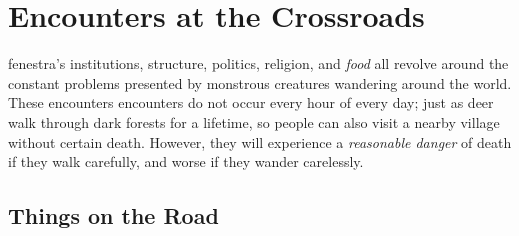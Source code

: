 \chapter{Encounters at the Crossroads}
\label{encounters}

\Gls{fenestra}'s institutions, structure, politics, religion, and \emph{food} all revolve around the constant problems presented by monstrous creatures wandering around the world.
These encounters encounters do not occur every hour of every day; just as deer walk through dark forests for a lifetime, so people can also visit a nearby village without certain death.
However, they will experience a \textit{reasonable danger} of death if they walk carefully, and worse if they wander carelessly.

\section{Things on the Road}

